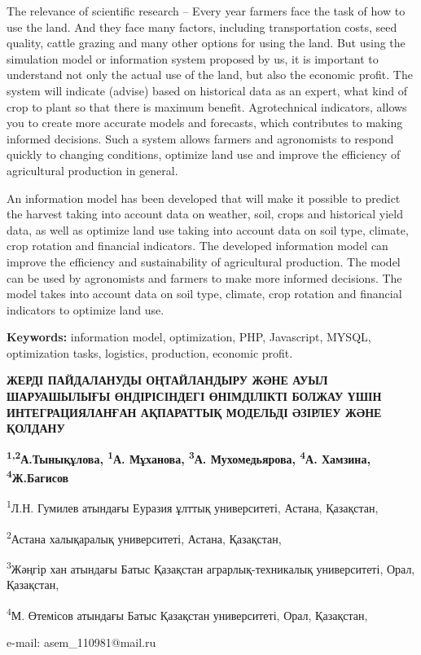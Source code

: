 The relevance of scientific research -- Every year farmers face the task
of how to use the land. And they face many factors, including
transportation costs, seed quality, cattle grazing and many other
options for using the land. But using the simulation model or
information system proposed by us, it is important to understand not
only the actual use of the land, but also the economic profit. The
system will indicate (advise) based on historical data as an expert,
what kind of crop to plant so that there is maximum benefit.
Agrotechnical indicators, allows you to create more accurate models and
forecasts, which contributes to making informed decisions. Such a system
allows farmers and agronomists to respond quickly to changing
conditions, optimize land use and improve the efficiency of agricultural
production in general.

An information model has been developed that will make it possible to
predict the harvest taking into account data on weather, soil, crops and
historical yield data, as well as optimize land use taking into account
data on soil type, climate, crop rotation and financial indicators. The
developed information model can improve the efficiency and
sustainability of agricultural production. The model can be used by
agronomists and farmers to make more informed decisions. The model takes
into account data on soil type, climate, crop rotation and financial
indicators to optimize land use.

{\bfseries Keywords:} information model, optimization, PHP, Javascript,
MYSQL, optimization tasks, logistics, production, economic profit.

\begin{center}
{\large\bfseries ЖЕРДІ ПАЙДАЛАНУДЫ ОҢТАЙЛАНДЫРУ ЖӘНЕ АУЫЛ ШАРУАШЫЛЫҒЫ
ӨНДІРІСІНДЕГІ ӨНІМДІЛІКТІ БОЛЖАУ ҮШІН ИНТЕГРАЦИЯЛАНҒАН АҚПАРАТТЫҚ
МОДЕЛЬДІ ӘЗІРЛЕУ ЖӘНЕ ҚОЛДАНУ}

{\bfseries \textsuperscript{1,2}А.Тынықұлова, \textsuperscript{1}А.
Мұханова, \textsuperscript{3}А. Мухомедьярова, \textsuperscript{4}А.
Хамзина, \textsuperscript{4}Ж.Багисов}

\textsuperscript{1}Л.Н. Гумилев атындағы Еуразия ұлттық университеті,
Астана, Қазақстан,

\textsuperscript{2}Астана халықаралық университеті, Астана, Қазақстан,

\textsuperscript{3}Жәңгір хан атындағы Батыс Қазақстан
аграрлық-техникалық университеті, Орал, Қазақстан,

\textsuperscript{4}М. Өтемісов атындағы Батыс Қазақстан университеті,
Орал, Қазақстан,

e-mail: asem\_110981@mail.ru
\end{center}

